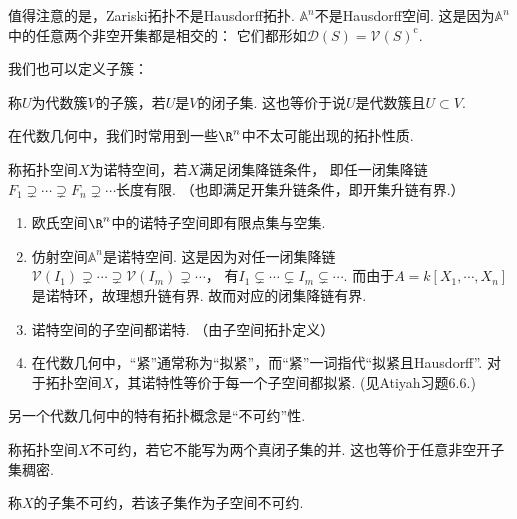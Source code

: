     值得注意的是，Zariski拓扑不是Hausdorff拓扑. 
    $\mathbb{A}^{n}$不是Hausdorff空间. 
    这是因为$\mathbb{A}^{n}$中的任意两个非空开集都是相交的：
    它们都形如$\mathcal{D}(S) = \mathcal{V}(S)^{\mathrm{c}}$.

    我们也可以定义子簇：

    \begin{definition}[子簇]
        称$U$为代数簇$V$的子簇，若$U$是$V$的闭子集. 这也等价于说$U$是代数簇且$U \subset V$.
    \end{definition}

    在代数几何中，我们时常用到一些$\R^{n}$中不太可能出现的拓扑性质.

    \begin{definition}[诺特空间]
        称拓扑空间$X$为诺特空间，若$X$满足闭集降链条件，
        即任一闭集降链$F_{1} \supsetneq \cdots \supsetneq F_{n} \supsetneq \cdots$长度有限.
        （也即满足开集升链条件，即开集升链有界.）
    \end{definition}

    \begin{example}
        \begin{enumerate}
            \item[(1)] 欧氏空间$\R^{n}$中的诺特子空间即有限点集与空集.
            \item[(2)] 仿射空间$\mathbb{A}^{n}$是诺特空间. 
                  这是因为对任一闭集降链
                  $\mathcal{V}(I_{1}) \supsetneq \cdots \supsetneq \mathcal{V}(I_{m}) \supsetneq \cdots$，
                  有$I_{1} \subsetneq \cdots \subsetneq I_{m} \subsetneq \cdots$. 
                  而由于$A = k[X_{1},\cdots,X_{n}]$是诺特环，故理想升链有界. 
                  故而对应的闭集降链有界.
            \item[(3)] 诺特空间的子空间都诺特. （由子空间拓扑定义）
            \item[(4)] 在代数几何中，``紧''通常称为``拟紧''，而``紧''一词指代``拟紧且Hausdorff''. 
                  对于拓扑空间$X$，其诺特性等价于每一个子空间都拟紧. (见Atiyah习题6.6.)
        \end{enumerate}
    \end{example}

    另一个代数几何中的特有拓扑概念是``不可约''性.

    \begin{definition}[不可约空间]
        称拓扑空间$X$不可约，若它不能写为两个真闭子集的并. 这也等价于任意非空开子集稠密. \par
        称$X$的子集不可约，若该子集作为子空间不可约.
    \end{definition}

